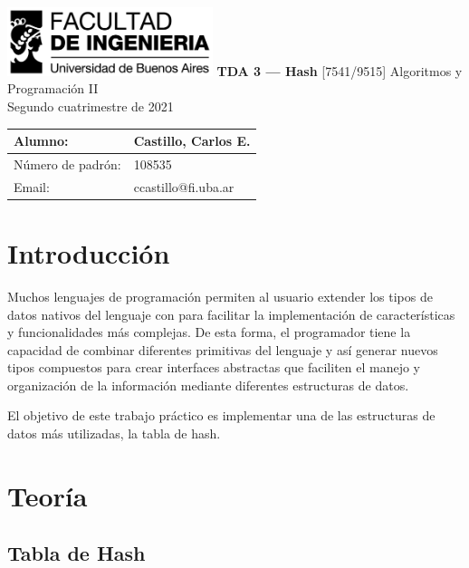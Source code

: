 \documentclass[titlepage,a4paper]{article}
\makeatletter
\newcommand{\FirstName}{Carlos E.}
\newcommand{\LastName}{Castillo}
\newcommand{\StudentID}{108535}
\newcommand{\StudentEmail}{ccastillo@fi.uba.ar}
\newcommand{\ProjectName}{TDA 3 — Hash}
\makeatother
\begin{document}
\begin{titlepage}
	\hfill\includegraphics[width=6cm]{logofiuba.jpg}
    \centering
    \vfill
    \Huge \textbf{\ProjectName}
    \vskip2cm
    \Large [7541/9515] Algoritmos y Programación II\\
    Segundo cuatrimestre de 2021 
    \vfill
    \begin{tabular}{ | l | l | }
      \hline
      Alumno: & \LastName, \FirstName \\ \hline
      Número de padrón: & \StudentID \\ \hline
      Email: & \StudentEmail \\ \hline
  	\end{tabular}
    \vfill
    \vfill
\end{titlepage}

\tableofcontents
\newpage


\section{Introducción}\label{sec:intro}

Muchos lenguajes de programación permiten al usuario extender los tipos de datos
nativos del lenguaje con para facilitar la implementación de características y
funcionalidades más complejas. De esta forma, el programador tiene la capacidad
de combinar diferentes primitivas del lenguaje y así generar nuevos tipos
compuestos para crear interfaces abstractas que faciliten el manejo y
organización de la información mediante diferentes estructuras de datos.

El objetivo de este trabajo práctico es implementar una de las estructuras de
datos más utilizadas, la tabla de hash. 


\section{Teoría}\label{sec:teoria}

\subsection{Tabla de Hash}
\end{document}
